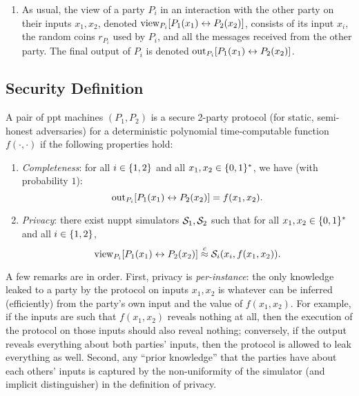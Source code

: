\documentclass[11pt]{article}
\begin{document}
\begin{enumerate}
\item As usual, the view of a party $P_i$ in an interaction with the
  other party on their inputs $x_{1}, x_{2}$, denoted
  $\text{view}_{P_{i}}[P_{1}(x_{1}) \leftrightarrow P_{2}(x_{2})]$, consists
  of its input $x_i$, the random coins $r_{P_i}$ used by $P_{i}$, and
  all the messages received from the other party.  The final output of
  $P_{i}$ is denoted $\text{out}_{P_{i}}[P_{1}(x_{1}) \leftrightarrow
  P_{2}(x_{2})]$.
\end{enumerate}

\subsection{Security Definition}
\label{sec:security-definition}

\begin{definition}
  \label{def:two-party}
  A pair of ppt machines $(P_1,P_2)$ is a secure 2-party protocol (for
  static, semi-honest adversaries) for a deterministic polynomial
  time-computable function $f(\cdot,\cdot)$ if the following
  properties hold:
  \begin{enumerate}
  \item \emph{Completeness}: for all $i \in \{1,2\}$ and all $x_1,
    x_2 \in \{0,1\}^{*}$, we have (with probability $1$): \[
    \text{out}_{P_{i}}[P_{1}(x_{1}) \leftrightarrow P_{2}(x_{2})] =
    f(x_1,x_2). \]

  \item \emph{Privacy}: there exist nuppt simulators $\mathcal{S}_1, \mathcal{S}_2$
    such that for all $x_{1}, x_{2} \in \{0,1\}^{*}$ and all $i \in
    \{1,2\}$, \[ \text{view}_{P_{i}}[P_{1}(x_{1}) \leftrightarrow
    P_{2}(x_{2})] \stackrel{c}{\approx} \mathcal{S}_{i}(x_{i}, f(x_{1}, x_{2})). \]
  \end{enumerate}
\end{definition}

A few remarks are in order.  First, privacy is \emph{per-instance}:
the only knowledge leaked to a party by the protocol on inputs $x_{1},
x_{2}$ is whatever can be inferred (efficiently) from the party's own
input and the value of $f(x_{1}, x_{2})$.  For example, if the inputs
are such that $f(x_{1}, x_{2})$ reveals nothing at all, then the
execution of the protocol on those inputs should also reveal nothing;
conversely, if the output reveals everything about both parties'
inputs, then the protocol is allowed to leak everything as well.
Second, any ``prior knowledge'' that the parties have about each
others' inputs is captured by the non-uniformity of the simulator (and
implicit distinguisher) in the definition of privacy.
\end{document}
